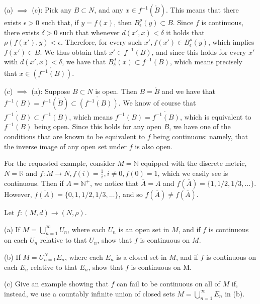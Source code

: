 \begin{solution}
    (a) $\implies$ (c): Pick any $B \subset N$, and any $x \in f^{-1}(\mathring{B})$.
    This means that there exists $\epsilon > 0$ such that, if $y = f(x)$, then $B_{\epsilon}^{\rho}(y) \subset B$.
    Since $f$ is continuous, there exists $\delta > 0$ such that whenever $d(x', x) < \delta$ it holds that $\rho(f(x'), y) < \epsilon$.
    Therefore, for every such $x', f(x') \in B_{\epsilon}^{\rho}(y)$, which implies $f(x') \in B$.
    We thus obtain that $x' \in f^{-1}(B)$, and since this holds for every $x'$ with $d(x', x) < \delta$, we have that $B_{\delta}^{d}(x) \subset f^{-1}(B)$, which means precisely that $x \in \mathring{(f^{-1}(B))}$.

    (c) $\implies$ (a): Suppose $B \subset N$ is open.
    Then $B = \mathring{B}$ and we have that $f^{-1}(B) = f^{-1}(\mathring{B}) \subset \mathring{(f^{-1}(B))}$.
    We know of course that $\mathring{f^{-1}(B)} \subset f^{-1}(B)$, which means $f^{-1}(B) = \mathring{f^{-1}(B)}$, which is equivalent to $f^{-1}(B)$ being open.
    Since this holds for any open $B$, we have one of the conditions that are known to be equivalent to $f$ being continuous: namely, that the inverse image of any open set under $f$ is also open.

    For the requested example, consider $M = \mathbb{N}$ equipped with the discrete metric, $N = \mathbb{R}$ and $f: M \rightarrow N, f(i) = \frac{1}{i}, i \neq 0, f(0) = 1$, which we easily see is continuous.
    Then if $A = \mathbb{N}^+$, we notice that $\overline{A} = A$ and $f(\overline{A}) = \{1, 1/2, 1/3, \ldots\}$.
    However, $\overline{f(A)} = \{0, 1, 1/2, 1/3, \ldots\}$, and so $f(\overline{A}) \neq f(\overline{A})$.

\end{solution}

\begin{exercise}{31}
    Let $f: (M, d) \rightarrow (N, \rho)$.

    (a) If $M = \bigcup_{n = 1}^{\infty} U_n$, where each $U_n$ is an open set in $M$, and if $f$ is continuous on each $U_n$ relative to that $U_n$, show that $f$ is continuous on $M$.

    (b) If $M = U_{n=1}^{N} E_n$, where each $E_n$ is a closed set in $M$, and if $f$ is continuous on each $E_n$ relative to that $E_n$, show that $f$ is continuous on M.

    (c) Give an example showing that $f$ can fail to be continuous on all of $M$ if, instead, we use a countably infinite union of closed sets $M = \bigcup_{n=1}^{\infty} E_n$ in (b).
\end{exercise}

